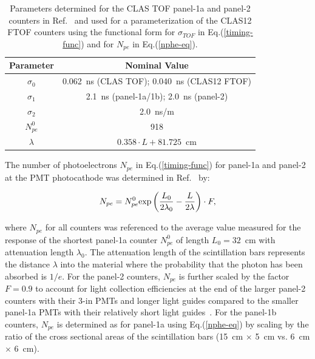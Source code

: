 \documentclass[3p,times,twocolumn]{elsarticle}
\begin{document}
\begin{table}[htbp]
\begin{center}
\begin{tabular} {c|c} \hline
Parameter    & Nominal Value\\ \hline
$\sigma_0$ & 0.062~ns (CLAS TOF); 0.040~ns (CLAS12 FTOF) \\ 
$\sigma_1$  & 2.1~ns (panel-1a/1b); 2.0~ns (panel-2) \\ 
$\sigma_2$  & 2.0~ns/m \\ 
$N_{pe}^0$   & 918 \\
$\lambda$   & $0.358\cdot L + 81.725$~cm \\ \hline
\end{tabular}
\caption{Parameters determined for the CLAS TOF panel-1a and panel-2 counters in Ref.~\cite{tof-nim}
and used for a parameterization of the CLAS12 FTOF counters using the functional form for $\sigma_{TOF}$
in Eq.(\ref{timing-func}) and for $N_{pe}$ in Eq.(\ref{nphe-eq}).}
\label{timing-parms}
\end{center}
\end{table}

The number of photoelectrons $N_{pe}$ in Eq.(\ref{timing-func}) for panel-1a and panel-2 at the PMT
photocathode was determined in Ref.~\cite{tof-nim} by:

\begin{equation}
\label{nphe-eq}
N_{pe} = N_{pe}^0 {\rm exp} \left( \frac{L_0}{2 \lambda_0} - \frac{L}{2 \lambda} \right) \cdot F,
\end{equation}

\noindent
where $N_{pe}$ for all counters was referenced to the average value measured for the response of
the shortest panel-1a counter $N_{pe}^0$ of length $L_0=32$~cm with attenuation length $\lambda_0$.
The attenuation length of the scintillation bars represents the distance $\lambda$ into the material
where the probability that the photon has been absorbed is $1/e$. For the panel-2 counters, $N_{pe}$
is further scaled by the factor $F = 0.9$ to account for light collection efficiencies at the end of the
larger panel-2 counters with their 3-in PMTs and longer light guides compared to the smaller panel-1a
PMTs with their relatively short light guides~\cite{tof-nim}. For the panel-1b counters, $N_{pe}$ is
determined as for panel-1a using Eq.(\ref{nphe-eq}) by scaling by the ratio of the cross sectional areas
of the scintillation bars (15~cm $\times$ 5~cm vs. 6~cm $\times$ 6~cm). 
\end{document}
